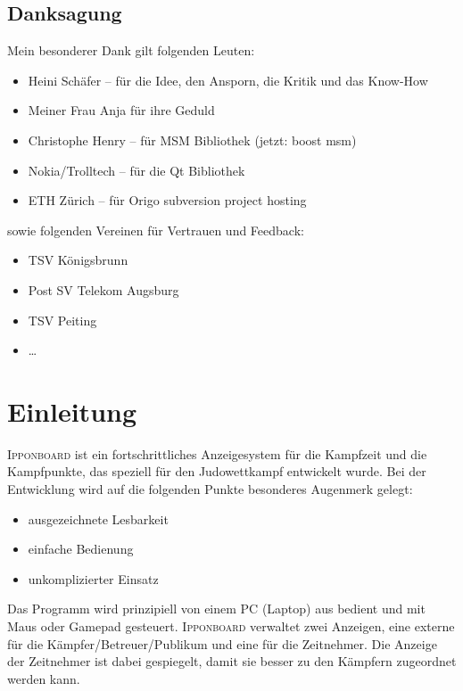 \documentclass[ngerman,12pt,numbers=noenddot]{scrreprt}
\newcommand*{\ipponboard}{
\fontspec[
]{Cuprum}
\selectfont 
\textsc{Ipponboard}}
\begin{document}
{\section*{Danksagung}
Mein besonderer Dank gilt folgenden Leuten:
\begin{itemize}
	\item Heini Sch\"afer -- f\"ur die Idee, den Ansporn, die Kritik und das Know-How
	\item Meiner Frau Anja f\"ur ihre Geduld
	\item Christophe Henry -- f\"ur MSM Bibliothek (jetzt: boost msm)
	\item Nokia/Trolltech -- f\"ur die Qt Bibliothek
	\item ETH Z\"urich -- f\"ur Origo subversion project hosting
\end{itemize}

sowie folgenden Vereinen f\"ur Vertrauen und Feedback:
\begin{itemize}
	\item TSV K\"onigsbrunn
	\item Post SV Telekom Augsburg
	\item TSV Peiting
	\item \dots
\end{itemize}


\renewcommand\contentsname{Inhalt}
\tableofcontents


\chapter{Einleitung}
{\ipponboard} ist ein fortschrittliches Anzeigesystem f\"ur die Kampfzeit und die Kampfpunkte, das speziell f\"ur den Judowettkampf entwickelt wurde. Bei der Entwicklung wird auf die folgenden Punkte besonderes Augenmerk gelegt:
\begin{itemize}
	\item ausgezeichnete Lesbarkeit
	\item einfache Bedienung
	\item unkomplizierter Einsatz
\end{itemize}

Das Programm wird prinzipiell von einem PC (Laptop) aus bedient und mit Maus oder Gamepad gesteuert. {\ipponboard} verwaltet zwei Anzeigen, eine externe f\"ur die K\"ampfer/Betreuer/Publikum und eine f\"ur die Zeitnehmer. Die Anzeige der Zeitnehmer ist dabei gespiegelt, damit sie besser zu den K\"ampfern zugeordnet werden kann.

}
\end{document}
